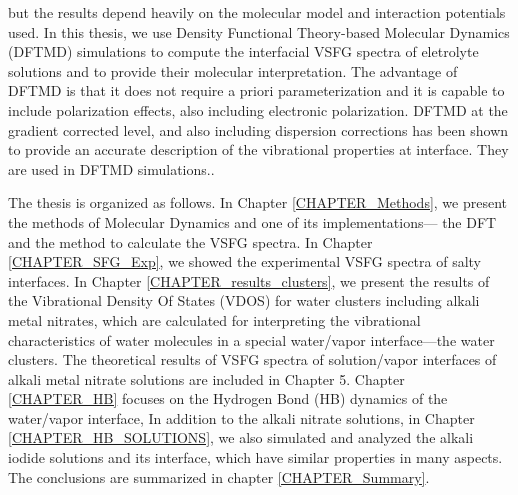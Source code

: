 but the results depend heavily on the molecular model and interaction potentials used. \cite{LXD03,MKP04,TI07,MM05}
In this thesis, we use Density Functional Theory-based Molecular Dynamics (DFTMD) simulations to compute 
the interfacial VSFG spectra of eletrolyte solutions and to provide their molecular interpretation.
The advantage of DFTMD is that it does not require a priori parameterization and it is capable to include polarization effects, \cite{Ufimtsev2011}
also including electronic polarization. DFTMD at the gradient corrected level, and also including dispersion corrections \cite{Grimme04,Grimme06,Grimme07,Grimme10,Baer2011}
has been shown to provide an accurate description of the vibrational properties at interface. \cite{Fornaro2015}
They are used in DFTMD simulations..

The thesis is organized as follows. 
In Chapter \ref{CHAPTER_Methods}, we present the methods of \abinitio Molecular Dynamics and one of its implementations--- 
the DFT and the method to calculate the VSFG spectra.
In Chapter \ref{CHAPTER_SFG_Exp}, we showed the experimental VSFG spectra of salty interfaces.
In Chapter \ref{CHAPTER_results_clusters}, we present the results of the Vibrational Density Of States (VDOS) for water clusters including alkali metal nitrates, 
which are calculated for interpreting the vibrational characteristics of water molecules in a special water/vapor interface---the water clusters.
The theoretical results of VSFG spectra of solution/vapor interfaces of alkali metal nitrate solutions are included in Chapter 5. 
Chapter \ref{CHAPTER_HB} focuses on the Hydrogen Bond (HB) dynamics of the water/vapor interface, 
In addition to the alkali nitrate solutions, in Chapter \ref{CHAPTER_HB_SOLUTIONS}, we also simulated and analyzed the alkali iodide solutions and its interface, which have similar properties in many aspects. 
The conclusions are summarized in chapter \ref{CHAPTER_Summary}.

